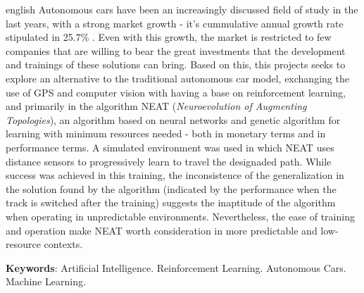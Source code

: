 \begin{resumo}[Abstract]
	\begin{otherlanguage*}{english}
		Autonomous cars have been an increasingly discussed field of study in
		the last years, with a strong market growth - it's cummulative annual
		growth rate stipulated in 25.7\% \cite{globe2022}. Even with this
		growth, the market is restricted to few companies that are willing to
		bear the great investments that the development and trainings of these
		solutions can bring. Based on this, this projects seeks to explore an
		alternative to the traditional autonomous car model, exchanging the use
		of GPS and computer vision with having a base on reinforcement
		learning, and primarily in the algorithm NEAT (\textit{Neuroevolution
		of Augmenting Topologies}), an algorithm based on neural networks and
		genetic algorithm for learning with minimum resources needed - both in
		monetary terms and in performance terms. A simulated environment was
		used in which NEAT uses distance sensors to progressively learn to
		travel the designaded path. While success was achieved in this
		training, the inconsistence of the generalization in the solution found
		by the algorithm (indicated by the performance when the track is
		switched after the training) suggests the inaptitude of the algorithm
		when operating in unpredictable environments. Nevertheless, the ease of
		training and operation make NEAT worth consideration in more
		predictable and low-resource contexts.

        \vspace{\onelineskip}

        \noindent 
        \textbf{Keywords}: Artificial Intelligence. Reinforcement Learning. Autonomous Cars. Machine Learning.
    \end{otherlanguage*}
\end{resumo}
